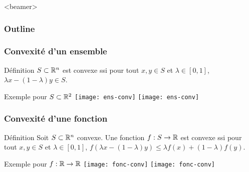 \documentclass{beamer}
\newcommand{\R}{{\ensuremath\mathbb{R}}}
\begin{document}
\begin{frame}<beamer>
  \frametitle{Outline}
  \tableofcontents[currentsection]
\end{frame}


\begin{frame}
  \frametitle{Convexité d'un ensemble}

  \begin{block}{Définition}
    $S \subset \R^n$ est convexe ssi  
    pour tout $x,y \in S$ et $\lambda \in [0,1]$,
    $\lambda x - (1 - \lambda) y \in S$. 
  \end{block}

  \begin{exampleblock}{Exemple pour $S \subset \R^2$}
    \centering
    \texttt{[image: ens-conv]} \hspace{0.05\textwidth}
    \texttt{[image: ens-conv]}
  \end{exampleblock}
  
\end{frame}

\begin{frame}
  \frametitle{Convexité d'une fonction}

  \begin{block}{Définition}
     Soit $S \subset \R^n$ convexe.
     Une fonction $f : S \rightarrow \R$ est convexe ssi  
    pour tout $x,y \in S$ et $\lambda \in [0,1]$,
    $f(\lambda x - (1 - \lambda) y) \leq \lambda f(x) + (1 - \lambda) f(y)$. 
  \end{block}

  \begin{exampleblock}{Exemple pour $f:\R \rightarrow \R$}
    \centering
    \texttt{[image: fonc-conv]} \hspace{0.05\textwidth}
    \texttt{[image: fonc-conv]}
  \end{exampleblock}
  
\end{frame}


\end{document}
